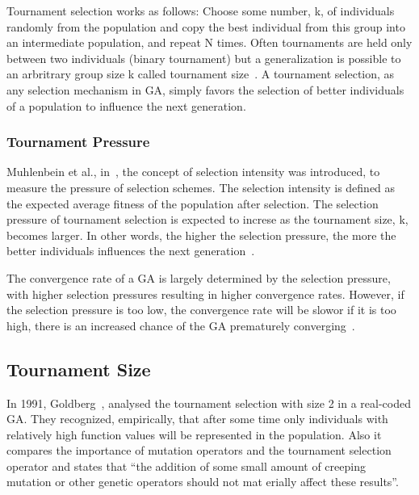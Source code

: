 Tournament selection works as follows: Choose some number, k, of individuals randomly from the population and copy the best individual from this group into an intermediate population, and repeat N times. Often tournaments are held only between two individuals (binary tournament) but a generalization is possible to an arbritrary group size k called tournament size~\cite{blickle1995mathematical}. A tournament selection, as any selection mechanism in GA, simply favors the selection of better individuals of a population to influence the next generation. 



\subsubsection{Tournament Pressure}\label{sec:background:tournament_pressure} 
Muhlenbein et al., in~\cite{muhlenbein1993predictive}, the concept of selection intensity was introduced, to measure the pressure of selection schemes. The selection intensity is defined as the expected average fitness of the population after selection. The selection pressure of tournament selection is expected to increse as the tournament size, k, becomes larger. In other words, the higher the selection pressure, the more the better individuals influences the next generation~\cite{miller1995genetic}.  

The convergence rate of a GA is largely determined by the selection pressure, with higher selection pressures resulting in higher convergence rates. However, if the selection pressure is too low, the convergence rate will be slowor if it is too high, there is an increased chance of the GA prematurely converging~\cite{miller1995genetic}.  

\subsection{Tournament Size}\label{sec:background:tournament_size} 

In 1991, Goldberg~\cite{goldberg1991real}, analysed the tournament selection with size 2 in a real-coded GA. They recognized, empirically, that after some time only individuals with relatively high function values will be represented in the population. Also it compares the importance of mutation operators and the tournament selection operator and states that ``the addition of some small amount of creeping mutation or other genetic operators should not mat erially affect these results''.

